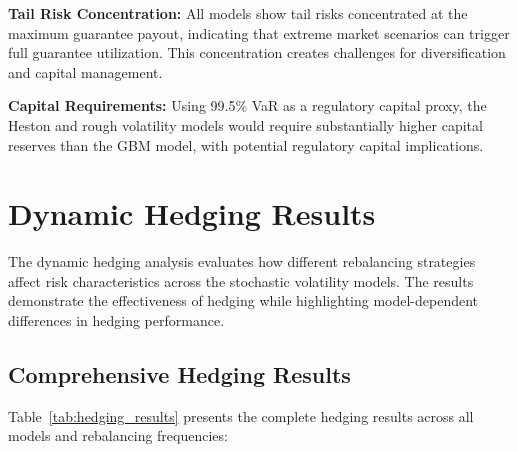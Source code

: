 \documentclass[12pt,a4paper]{report}
\begin{document}
\textbf{Tail Risk Concentration:} All models show tail risks concentrated at the maximum guarantee payout, indicating that extreme market scenarios can trigger full guarantee utilization. This concentration creates challenges for diversification and capital management.

\textbf{Capital Requirements:} Using 99.5\% VaR as a regulatory capital proxy, the Heston and rough volatility models would require substantially higher capital reserves than the GBM model, with potential regulatory capital implications.

\section{Dynamic Hedging Results}

The dynamic hedging analysis evaluates how different rebalancing strategies affect risk characteristics across the stochastic volatility models. The results demonstrate the effectiveness of hedging while highlighting model-dependent differences in hedging performance.

\subsection{Comprehensive Hedging Results}

Table~\ref{tab:hedging_results} presents the complete hedging results across all models and rebalancing frequencies:
\end{document}
